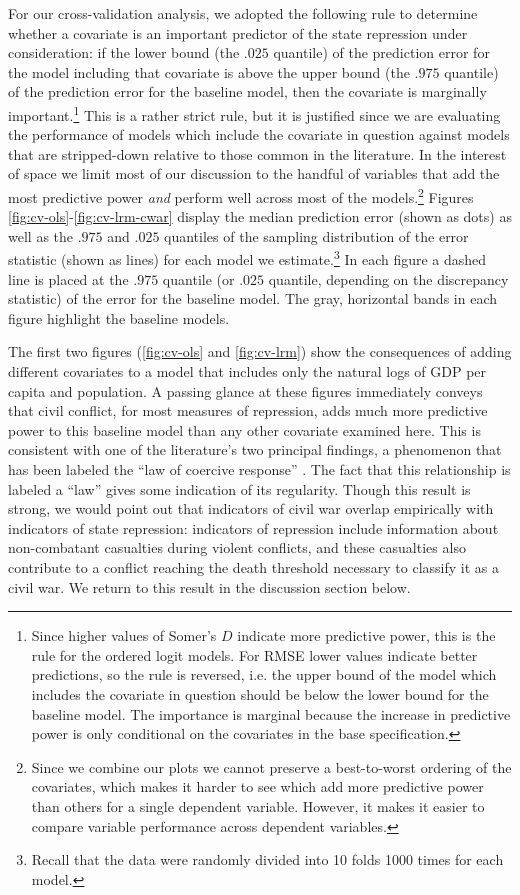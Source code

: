 \documentclass[11pt]{article}
\begin{document}
For our cross-validation analysis, we adopted the following rule to determine whether a covariate is an important predictor of the state repression under consideration: if the lower bound (the $.025$ quantile) of the prediction error for the model including that covariate is above the upper bound (the $.975$ quantile) of the prediction error for the baseline model, then the covariate is marginally important.\footnote{Since higher values of Somer's $D$ indicate more predictive power, this is the rule for the ordered logit models. For RMSE lower values indicate better predictions, so the rule is reversed, i.e. the upper bound of the model which includes the covariate in question should be below the lower bound for the baseline model. The importance is marginal because the increase in predictive power is only conditional on the covariates in the base specification.} This is a rather strict rule, but it is justified since we are evaluating the performance of models which include the covariate in question against models that are stripped-down relative to those common in the literature. In the interest of space we limit most of our discussion to the handful of variables that add the most predictive power {\em and} perform well across most of the models.\footnote{Since we combine our plots we cannot preserve a best-to-worst ordering of the covariates, which makes it harder to see which add more predictive power than others for a single dependent variable. However, it makes it easier to compare variable performance across dependent variables.} Figures \ref{fig:cv-ols}-\ref{fig:cv-lrm-cwar} display the median prediction error (shown as dots) as well as the $.975$ and $.025$ quantiles of the sampling distribution of the error statistic (shown as lines) for each model we estimate.\footnote{Recall that the data were randomly divided into 10 folds 1000 times for each model.} In each figure a dashed line is placed at the $.975$ quantile (or $.025$ quantile, depending on the discrepancy statistic) of the error for the baseline model. The gray, horizontal bands in each figure highlight the baseline models.

The first two figures (\ref{fig:cv-ols} and \ref{fig:cv-lrm}) show the consequences of adding different covariates to a model that includes only the natural logs of GDP per capita and population. A passing glance at these figures immediately conveys that civil conflict, for most measures of repression, adds much more predictive power to this baseline model than any other covariate examined here. This is consistent with one of the literature's two principal findings, a phenomenon that has been labeled the ``law of coercive response'' \citep{Davenport2007AR}. The fact that this relationship is labeled a ``law'' gives some indication of its regularity. Though this result is strong, we would point out that indicators of civil war overlap empirically with indicators of state repression: indicators of repression include information about non-combatant casualties during violent conflicts, and these casualties also contribute to a conflict reaching the death threshold necessary to classify it as a civil war. We return to this result in the discussion section below. 
\end{document}
